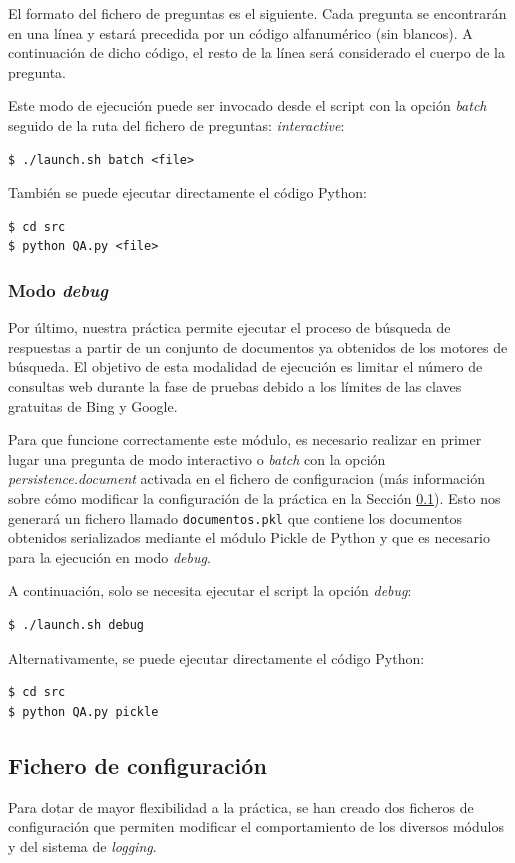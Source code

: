 \documentclass[12pt,a4paper,titlepage]{article}
\begin{document}
El formato del fichero de preguntas es el siguiente. Cada pregunta se encontrarán en una línea y estará precedida por un código alfanumérico (sin blancos). A continuación de dicho código, el resto de la línea será considerado el cuerpo de la pregunta.

Este modo de ejecución puede ser invocado desde el script con la opción \emph{batch} seguido de la ruta del fichero de preguntas:
\emph{interactive}:
\begin{lstlisting}
$ ./launch.sh batch <file>
\end{lstlisting}

También se puede ejecutar directamente el código Python:
\begin{lstlisting}
$ cd src
$ python QA.py <file>
\end{lstlisting}

\subsubsection{Modo \emph{debug}}
Por último, nuestra práctica permite ejecutar el proceso de búsqueda de respuestas a partir de un conjunto de documentos ya obtenidos de los motores de búsqueda. El objetivo de esta modalidad de ejecución es limitar el número de consultas web durante la fase de pruebas debido a los límites de las claves gratuitas de Bing y Google.

Para que funcione correctamente este módulo, es necesario realizar en primer lugar una pregunta de modo interactivo o \emph{batch} con la opción \emph{persistence.document} activada en el fichero de configuracion (más información sobre cómo modificar la configuración de la práctica en la Sección \ref{section:conf}). Esto nos generará un fichero llamado \texttt{documentos.pkl} que contiene los documentos obtenidos serializados mediante el módulo Pickle de Python y que es necesario para la ejecución en modo \emph{debug}.

A continuación, solo se necesita ejecutar el script la opción \emph{debug}:
\begin{lstlisting}
$ ./launch.sh debug
\end{lstlisting}

Alternativamente, se puede ejecutar directamente el código Python:
\begin{lstlisting}
$ cd src
$ python QA.py pickle
\end{lstlisting}

\subsection{Fichero de configuración}
\label{section:conf}
Para dotar de mayor flexibilidad a la práctica, se han creado dos ficheros de configuración que permiten modificar el comportamiento de los diversos módulos y del sistema de \emph{logging}.
\end{document}
